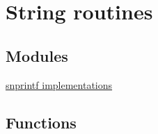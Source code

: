 \hypertarget{group__apr__strings}{\section{String routines}
\label{group__apr__strings}
}
\subsection*{Modules}
\begin{DoxyCompactItemize}
\item 
\hyperlink{group___a_p_r___strings___snprintf}{snprintf implementations}
\end{DoxyCompactItemize}
\subsection*{Functions}
